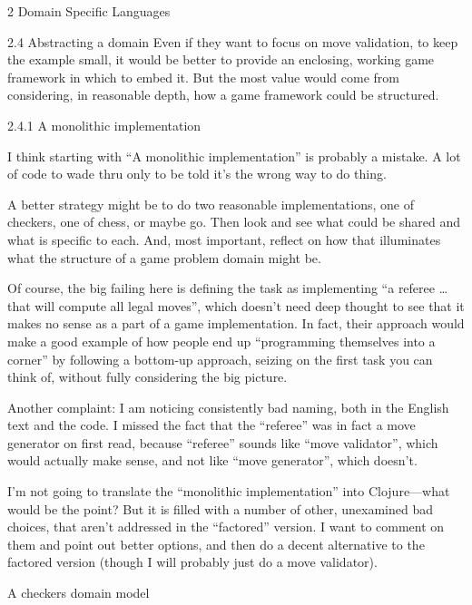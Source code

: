 \documentclass[12pt]{PalisadesLakesBook}
\begin{document}
\begin{plSection}{2 Domain Specific Languages}
\begin{plSection}{2.4 Abstracting a domain}
Even if they want to focus on move validation,
to keep the example small, it would be better to provide
an enclosing, working game framework in which to embed it.
But the most value would come from considering,
in reasonable depth,
how a game framework could be structured.

\begin{plSection}{2.4.1 A monolithic implementation}

I think starting with ``A monolithic implementation'' 
is probably a mistake.
A lot of code to wade thru only to be told it's the wrong way
to do thing.

A better strategy might be to do two reasonable implementations,
one of checkers, one of chess, or maybe go.
Then look and see what could be shared and 
what is specific to each.
And, most important, reflect on how that illuminates 
what the structure of a game problem domain might be.

Of course, the big failing here is defining the task as 
implementing
``a referee {\ldots} that will compute all legal moves'',
which doesn't need deep thought to see that it makes no sense
as a part of a game implementation.
In fact, their approach would make a good example of how
people end up ``programming themselves into a corner''
by following a bottom-up approach,
seizing on the first task you can think of, 
without fully considering the big picture.

Another complaint: I am noticing consistently bad naming,
both in the English text and the code.
I missed the fact that the ``referee'' was in fact a move
generator on first read, because ``referee'' sounds
like ``move validator'', which would actually make sense,
and not like ``move generator'', which doesn't.

I'm not going to translate the ``monolithic implementation''
into Clojure---what would be the point?
But it is filled with a number of other, unexamined
bad choices, that aren't
addressed in the ``factored'' version.
I want to comment on them and point out better options,
and then do a decent alternative to the factored version
(though I will probably just do a move validator).

\begin{plSection}{A checkers domain model}


\end{plSection}
\end{plSection}
\end{plSection}
\end{plSection}
\end{document}
